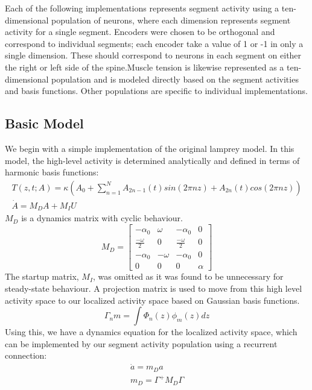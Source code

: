\documentclass[12pt]{article}
\begin{document}
Each of the following implementations represents segment activity using a ten-dimensional population of neurons, where each dimension represents segment activity for a single segment. Encoders were chosen to be orthogonal and correspond to individual segments; each encoder take a value of 1 or -1 in only a single dimension. These should correspond to neurons in each segment on either the right or left side of the spine.Muscle tension is likewise represented as a ten-dimensional population and is modeled directly based on the segment activities and basis functions. Other populations are specific to individual implementations.

\subsection{Basic Model}

We begin with a simple implementation of the original lamprey model. In this model, the high-level activity is determined analytically and defined in terms of harmonic basis functions:
\begin{gather}
  T(z,t; A) = \kappa (A_0 + \sum_{n=1}^N A_{2n-1}(t)sin(2\pi nz) + A_{2n}(t)cos(2\pi nz)) \\
  \dot{A} = M_D A + M_I U
\end{gather} 
\(M_D\) is a dynamics matrix with cyclic behaviour.
\begin{equation}
  M_D = \begin{bmatrix} -\alpha_0 & \omega & -\alpha_0 & 0 \\ \frac{-\omega}{2} & 0 & \frac{-\omega}{2} & 0 \\ -\alpha_0 & -\omega & -\alpha_0 & 0 \\ 0 & 0 & 0 & \alpha \end{bmatrix}
\end{equation}
The startup matrix, \(M_I\), was omitted as it was found to be unnecessary for steady-state behaviour. 
A projection matrix is used to move from this high level activity space to our localized activity space based on Gaussian basis functions.
\begin{equation}
    \Gamma_nm = \int \Phi_n(z)\phi_m(z)dz 
\end{equation}
Using this, we have a dynamics equation for the localized activity space, which can be implemented by our segment activity population using a recurrent connection:
\begin{gather}
  \dot{a} = m_D a \\
  m_D = \Gamma^{+} M_D \Gamma
\end{gather} 
\end{document}
